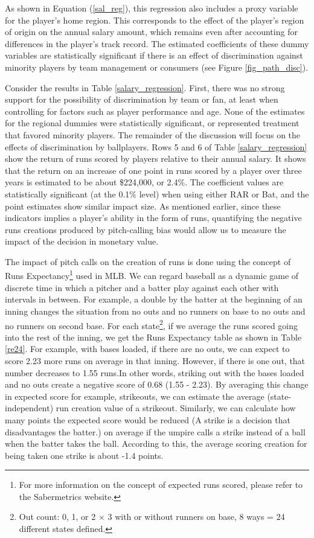 \documentclass[dvipdfmx, 12pt]{jsarticle}
\begin{document}
As shown in Equation (\ref{sal_reg}), this regression also includes a proxy variable for the player's home region. This corresponds to the effect of the player's region of origin on the annual salary amount, which remains even after accounting for differences in the player's track record. The estimated coefficients of these dummy variables are statistically significant if there is an effect of discrimination against minority players by team management or consumers (see Figure \ref{fig_path_disc}).

Consider the results in Table \ref{salary_regression}. First, there was no strong support for the possibility of discrimination by team or fan, at least when controlling for factors such as player performance and age. None of the estimates for the regional dummies were statistically significant, or represented treatment that favored minority players. The remainder of the discussion will focus on the effects of discrimination by ballplayers.
Rows 5 and 6 of Table \ref{salary_regression} show the return of runs scored by players relative to their annual salary. It shows that the return on an increase of one point in runs scored by a player over three years is estimated to be about \$224,000, or 2.4\%. The coefficient values are statistically significant (at the 0.1\% level) when using either RAR or Bat, and the point estimates show similar impact size. As mentioned earlier, since these indicators implies a player's ability in the form of runs, quantifying the negative runs creations produced by pitch-calling bias would allow us to measure the impact of the decision in monetary value.

The impact of pitch calls on the creation of runs is done using the concept of Runs Expectancy\footnote{For more information on the concept of expected runs scored, please refer to the Sabermetrics website.} used in MLB.
We can regard baseball as a dynamic game of discrete time in which a pitcher and a batter play against each other with intervals in between. For example, a double by the batter at the beginning of an inning changes the situation from no outs and no runners on base to no outs and no runners on second base. For each state\footnote{Out count: 0, 1, or 2 $\times$ 3 with or without runners on base, 8 ways = 24 different states defined.}, if we average the runs scored going into the rest of the inning, we get the Runs Expectancy table as shown in Table \ref{re24}. For example, with bases loaded, if there are no outs, we can expect to score 2.23 more runs on average in that inning. However, if there is one out, that number decreases to 1.55 runs.In other words, striking out with the bases loaded and no outs create a negative score of 0.68 (1.55 - 2.23). By averaging this change in expected score for example, strikeouts, we can estimate the average (state-independent) run creation value of a strikeout. Similarly, we can calculate how many points the expected score would be reduced (A strike is a decision that disadvantages the batter.) on average if the umpire calls a strike instead of a ball when the batter takes the ball. According to this, the average scoring creation for being taken one strike is about -1.4 points.
\end{document}
